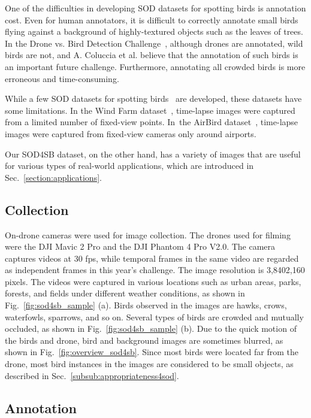 \documentclass{mva_style}
\begin{document}
One of the difficulties in developing SOD datasets for spotting birds is annotation cost.
Even for human annotators, it is difficult to correctly annotate small birds flying against a background of highly-textured objects such as the leaves of trees. In the Drone vs. Bird Detection Challenge~\cite{coluccia2021drone}, although drones are annotated, wild birds are not, and A. Coluccia et al. believe that the annotation of such birds is an important future challenge.
Furthermore, annotating all crowded birds is more erroneous and time-consuming.


While a few SOD datasets for spotting birds~\cite{yoshihashi2017bird,yoshihashi2015construction,sun2022airbirds} are developed, these datasets have some limitations.
In the Wind Farm dataset~\cite{yoshihashi2017bird,yoshihashi2015construction}, time-lapse images were captured from a limited number of fixed-view points.
In~the AirBird dataset~\cite{sun2022airbirds}, time-lapse images were captured from fixed-view cameras only around airports.

Our SOD4SB dataset, on the other hand, has a variety of images that are useful for various types of real-world applications, which are introduced in Sec.~\ref{section:applications}.

\subsection{Collection} 

On-drone cameras were used for image collection. The drones used for filming were the DJI Mavic 2 Pro and the DJI Phantom 4 Pro V2.0.
The camera captures videos at 30 fps, while temporal frames in the same video are regarded as independent frames in this year's challenge.
The image resolution is 3,8402,160 pixels.
The videos were captured in various locations such as urban areas, parks, forests, and fields under different weather conditions, as shown in Fig.~\ref{fig:sod4sb_sample} (a).
Birds observed in the images are hawks, crows, waterfowls, sparrows, and so on.
Several types of birds are crowded and mutually occluded, as shown in Fig.~\ref{fig:sod4sb_sample} (b).
Due to the quick motion of the birds and drone, bird and background images are sometimes blurred, as shown in Fig.~\ref{fig:overview_sod4sb}.
Since most birds were located far from the drone, most bird instances in the images are considered to be small objects, as described in Sec.~\ref{subsub:appropriateness4sod}.

\subsection{Annotation}
\end{document}

